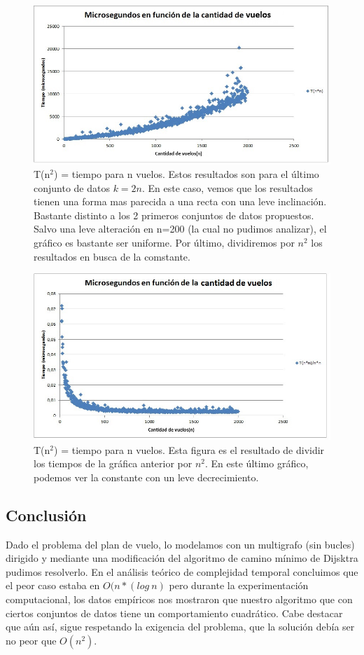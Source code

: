 \begin{figure}[H]
  \centering
  \includegraphics[scale=0.75]{Imagenes/Ej1/2n}
  \caption{T(n$^{2}$) = tiempo para n vuelos. Estos resultados son para el último conjunto de datos $k = 2n$. 
  En este caso, vemos que los resultados tienen una forma mas parecida a una recta con una leve inclinación. 
  Bastante distinto a los 2 primeros conjuntos de datos propuestos. Salvo una leve alteración en n=200 (la cual no pudimos analizar),
  el gráfico es bastante ser uniforme. Por último, dividiremos por $n^2$ los resultados en busca de la comstante.}
  \label{}
\end{figure}

\begin{figure}[H]
  \centering
  \includegraphics[scale=0.75]{Imagenes/Ej1/2nConst}
  \caption{T(n$^{2}$) = tiempo para n vuelos. Esta figura es el resultado de dividir los tiempos de la gráfica anterior por $n^2$.
    En este último gráfico, podemos ver la constante con un leve decrecimiento.}
  \label{}
\end{figure}


\subsection{Conclusión}
Dado el problema del plan de vuelo, lo modelamos con un multigrafo (sin bucles) dirigido y mediante una modificación 
del algoritmo de camino mínimo de Dijsktra pudimos resolverlo. En el análisis teórico de complejidad temporal concluimos
que el peor caso estaba en $O(n*(log\ n)$ pero durante la experimentación computacional, los datos empíricos nos mostraron
que nuestro algoritmo que con ciertos conjuntos de datos tiene un comportamiento cuadrático. Cabe destacar que aún así,
sigue respetando la exigencia del problema, que la solución debía ser no peor que $O(n^2)$.

